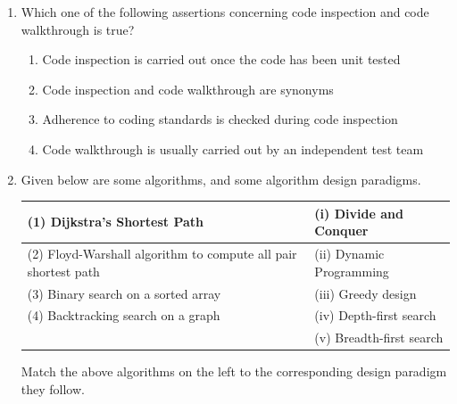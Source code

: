 \documentclass[journal,12pt,onecolumn]{IEEEtran}
\theoremstyle{remark}
\begin{document}
\begin{enumerate}
		\item Which one of the following assertions concerning code inspection and code walkthrough is true?
		
		\hfill{}
		
		\begin{enumerate}
			\item Code inspection is carried out once the code has been unit tested
			\item Code inspection and code walkthrough are synonyms
			\item Adherence to coding standards is checked during code inspection
			\item Code walkthrough is usually carried out by an independent test team
		\end{enumerate}
		
		\item Given below are some algorithms, and some algorithm design paradigms.\\
		\vspace{0.6cm}
		
		\begin{tabular}{|l|l|}
			\hline
			(1) Dijkstra’s Shortest Path & (i) Divide and Conquer \\
			\hline
			(2) Floyd-Warshall algorithm to compute all pair shortest path & (ii) Dynamic Programming \\
			\hline
			(3) Binary search on a sorted array & (iii) Greedy design \\
			\hline
			(4) Backtracking search on a graph & (iv) Depth-first search \\
			\hline
			& (v) Breadth-first search \\
			\hline
		\end{tabular}
				\vspace{0.6cm}

		
		Match the above algorithms on the left to the corresponding design paradigm they follow.
		
		\hfill{}
		
		\begin{enumerate}
		\end{enumerate}
		

\end{enumerate}
\end{document}
